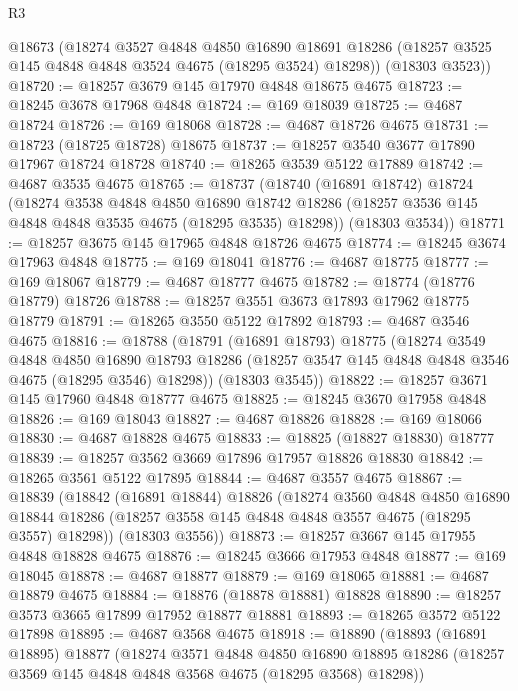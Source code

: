 \begin{lexlean}{R3}
\begin{coremodule}
      @18673
      (@18274
        @3527
        @4848
        @4850
        @16890
        @18691
        @18286
        (@18257 @3525 @145 @4848 @4848 @3524 @4675 (@18295 @3524) @18298))
      (@18303 @3523))
@18720 := @18257 @3679 @145 @17970 @4848 @18675 @4675
@18723 := @18245 @3678 @17968 @4848
@18724 := @169 @18039
@18725 := @4687 @18724
@18726 := @169 @18068
@18728 := @4687 @18726 @4675
@18731 := @18723 (@18725 @18728) @18675
@18737 := @18257 @3540 @3677 @17890 @17967 @18724 @18728
@18740 := @18265 @3539 @5122 @17889
@18742 := @4687 @3535 @4675
@18765 := @18737
    (@18740
      (@16891 @18742)
      @18724
      (@18274
        @3538
        @4848
        @4850
        @16890
        @18742
        @18286
        (@18257 @3536 @145 @4848 @4848 @3535 @4675 (@18295 @3535) @18298))
      (@18303 @3534))
@18771 := @18257 @3675 @145 @17965 @4848 @18726 @4675
@18774 := @18245 @3674 @17963 @4848
@18775 := @169 @18041
@18776 := @4687 @18775
@18777 := @169 @18067
@18779 := @4687 @18777 @4675
@18782 := @18774 (@18776 @18779) @18726
@18788 := @18257 @3551 @3673 @17893 @17962 @18775 @18779
@18791 := @18265 @3550 @5122 @17892
@18793 := @4687 @3546 @4675
@18816 := @18788
    (@18791
      (@16891 @18793)
      @18775
      (@18274
        @3549
        @4848
        @4850
        @16890
        @18793
        @18286
        (@18257 @3547 @145 @4848 @4848 @3546 @4675 (@18295 @3546) @18298))
      (@18303 @3545))
@18822 := @18257 @3671 @145 @17960 @4848 @18777 @4675
@18825 := @18245 @3670 @17958 @4848
@18826 := @169 @18043
@18827 := @4687 @18826
@18828 := @169 @18066
@18830 := @4687 @18828 @4675
@18833 := @18825 (@18827 @18830) @18777
@18839 := @18257 @3562 @3669 @17896 @17957 @18826 @18830
@18842 := @18265 @3561 @5122 @17895
@18844 := @4687 @3557 @4675
@18867 := @18839
    (@18842
      (@16891 @18844)
      @18826
      (@18274
        @3560
        @4848
        @4850
        @16890
        @18844
        @18286
        (@18257 @3558 @145 @4848 @4848 @3557 @4675 (@18295 @3557) @18298))
      (@18303 @3556))
@18873 := @18257 @3667 @145 @17955 @4848 @18828 @4675
@18876 := @18245 @3666 @17953 @4848
@18877 := @169 @18045
@18878 := @4687 @18877
@18879 := @169 @18065
@18881 := @4687 @18879 @4675
@18884 := @18876 (@18878 @18881) @18828
@18890 := @18257 @3573 @3665 @17899 @17952 @18877 @18881
@18893 := @18265 @3572 @5122 @17898
@18895 := @4687 @3568 @4675
@18918 := @18890
    (@18893
      (@16891 @18895)
      @18877
      (@18274
        @3571
        @4848
        @4850
        @16890
        @18895
        @18286
        (@18257 @3569 @145 @4848 @4848 @3568 @4675 (@18295 @3568) @18298))

\end{coremodule}
\end{lexlean}
